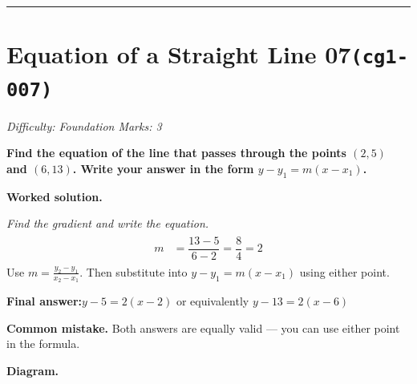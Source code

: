 \documentclass[11pt]{article}
\newcommand{\question}[1]{\par\medskip\noindent\textbf{#1}\par}
\begin{document}
\medskip\hrule

\section*{Equation of a Straight Line 07\quad\small\texttt{(cg1-007)}}
\textit{Difficulty: Foundation \quad\textbar\quad Marks: 3}

\question{Find the equation of the line that passes through the points \( (2, 5) \) and \( (6, 13) \). Write your answer in the form \( y - y_1 = m(x - x_1) \).}

\textbf{Worked solution.}

\textit{Find the gradient and write the equation.}
\[\begin{gathered}
\begin{aligned} m &= \dfrac{13 - 5}{6 - 2} = \dfrac{8}{4} = 2 \end{aligned}
\end{gathered}\]
Use \( m = \frac{y_2 - y_1}{x_2 - x_1} \). Then substitute into \( y - y_1 = m(x - x_1) \) using either point.

\begin{answerbox}
\textbf{Final answer:}\quad \(\displaystyle y - 5 = 2(x - 2)\) or equivalently \(\displaystyle y - 13 = 2(x - 6)\)
\end{answerbox}
\textbf{Common mistake.} Both answers are equally valid --- you can use either point in the formula.

\textbf{Diagram.}
\end{document}
